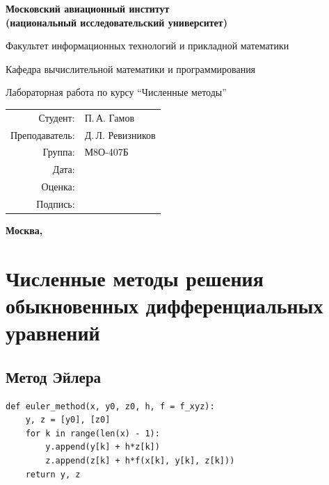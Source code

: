 \documentclass[pdf, unicode, 12pt, a4paper,oneside,fleqn]{article}
\begin{document}
\begin{titlepage}
\begin{center}
\bfseries
{\Large Московский авиационный институт\\ (национальный исследовательский университет)}

\vspace{48pt}
{\large Факультет информационных технологий и прикладной математики}

\vspace{36pt}
{\large Кафедра вычислительной математики и программирования}

\vspace{48pt}Лабораторная работа  по курсу 
\enquote{Численные методы}
\end{center}
\vspace{72pt}

\begin{flushright}
\begin{tabular}{rl}
Студент: & П.\,А. Гамов \\
Преподаватель: & Д.\,Л. Ревизников \\
Группа: & М8О-407Б \\
Дата: & \\
Оценка: & \\
Подпись: & \\
\end{tabular}
\end{flushright}
\vfill
\begin{center}
\bfseries
Москва, \the\year
\end{center}
\end{titlepage}

\pagebreak

\section{Численные методы решения обыкновенных дифференциальных уравнений}

\subsection{Метод Эйлера}

\begin{lstlisting}
def euler_method(x, y0, z0, h, f = f_xyz):
    y, z = [y0], [z0]
    for k in range(len(x) - 1):
        y.append(y[k] + h*z[k])
        z.append(z[k] + h*f(x[k], y[k], z[k]))
    return y, z
\end{lstlisting}
\end{document}
